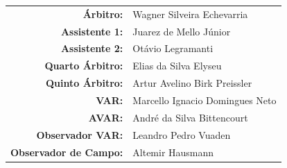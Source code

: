 \documentclass[11pt]{article}
\newcommand{\teamjersey}{}
\begin{document}
\vspace{0.5cm}
\begin{minipage}{0.65\textwidth}
\begin{center}
\begin{tabular}{rl}
\textbf{Árbitro:} & Wagner Silveira Echevarria \\
\textbf{Assistente 1:} & Juarez de Mello Júnior \\
\textbf{Assistente 2:} & Otávio Legramanti \\
\textbf{Quarto Árbitro:} & Elias da Silva Elyseu \\
\textbf{Quinto Árbitro:} & Artur Avelino Birk Preissler \\
\textbf{VAR:} & Marcello Ignacio Domingues Neto \\
\textbf{AVAR:} & André da Silva Bittencourt \\
\textbf{Observador VAR:} & Leandro Pedro Vuaden \\
\textbf{Observador de Campo:} & Altemir Hausmann \\
\end{tabular}
\end{center}
\end{minipage}
\begin{minipage}{0.3\textwidth}
\end{minipage}
\newpage
\vspace{0.5cm}
\renewcommand{\teamjersey}{../assets/camisa/costas1.png}
\end{document}
